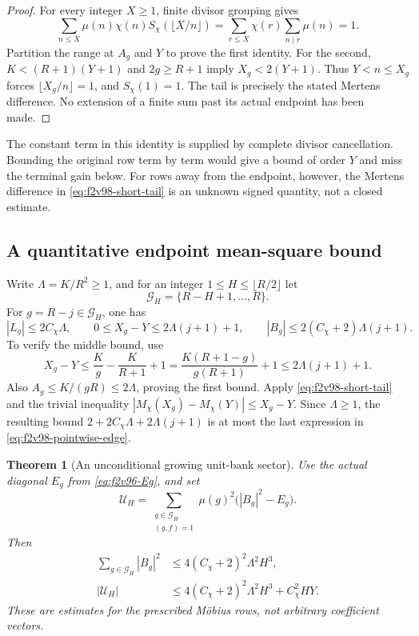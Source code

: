 \documentclass[11pt]{article}
\newtheorem{theorem}{Theorem}[section]
\theoremstyle{definition}
\theoremstyle{remark}
\begin{document}
\begin{proof}
For every integer \(X\ge1\), finite divisor grouping gives
\[
 \sum_{n\le X}\mu(n)\chi(n)S_\chi(\lfloor X/n\rfloor)
 =\sum_{r\le X}\chi(r)\sum_{n\mid r}\mu(n)=1.
\]
Partition the range at \(A_g\) and \(Y\) to prove the first identity.
For the second, \(K<(R+1)(Y+1)\) and \(2g\ge R+1\) imply
\(X_g<2(Y+1)\).  Thus \(Y<n\le X_g\) forces
\(\lfloor X_g/n\rfloor=1\), and \(S_\chi(1)=1\).
The tail is precisely the stated Mertens difference.  No extension
of a finite sum past its actual endpoint has been made.
\end{proof}

The constant term in this identity is supplied by complete divisor
cancellation.  Bounding the original row term by term would give a
bound of order \(Y\) and miss the terminal gain below.  For rows
away from the endpoint, however, the Mertens difference in
\eqref{eq:f2v98-short-tail} is an unknown signed quantity, not a
closed estimate.

\subsection{A quantitative endpoint mean-square bound}

Write \(\Lambda=K/R^2\ge1\), and for an integer
\(1\le H\le\lfloor R/2\rfloor\) let
\[
 \mathcal G_H=\{R-H+1,\ldots,R\}.
\]
For \(g=R-j\in\mathcal G_H\), one has
\begin{equation}
 |L_g|\le2C_\chi\Lambda,\qquad
 0\le X_g-Y\le2\Lambda(j+1)+1,
 \qquad
 |B_g|\le2(C_\chi+2)\Lambda(j+1).
 \label{eq:f2v98-pointwise-edge}
\end{equation}
To verify the middle bound, use
\[
 X_g-Y\le\frac K g-\frac K{R+1}+1
 =\frac{K(R+1-g)}{g(R+1)}+1
 \le2\Lambda(j+1)+1.
\]
Also \(A_g\le K/(gR)\le2\Lambda\), proving the first bound.
Apply \eqref{eq:f2v98-short-tail} and the trivial inequality
\(|M_\chi(X_g)-M_\chi(Y)|\le X_g-Y\).  Since \(\Lambda\ge1\),
the resulting bound
\(2+2C_\chi\Lambda+2\Lambda(j+1)\) is at most the last expression
in \eqref{eq:f2v98-pointwise-edge}.

\begin{theorem}[An unconditional growing unit-bank sector]
\label{thm:f2v98-edge-sector}
Use the actual diagonal \(E_g\) from \eqref{eq:f2v96-Eg}, and set
\begin{equation}
 \mathcal U_H=\sum_{\substack{g\in\mathcal G_H\\(g,f)=1}}
                         \mu(g)^2\bigl(|B_g|^2-E_g\bigr).
 \label{eq:f2v98-unit-edge}
\end{equation}
Then
\begin{align}
 \sum_{g\in\mathcal G_H}|B_g|^2
     &\le4(C_\chi+2)^2\Lambda^2 H^3,
 \label{eq:f2v98-edge-ms}\\
 |\mathcal U_H|
     &\le4(C_\chi+2)^2\Lambda^2 H^3+C_\chi^2HY.
 \label{eq:f2v98-edge-current}
\end{align}
These are estimates for the prescribed M\"obius rows, not arbitrary
coefficient vectors.
\end{theorem}
\end{document}
